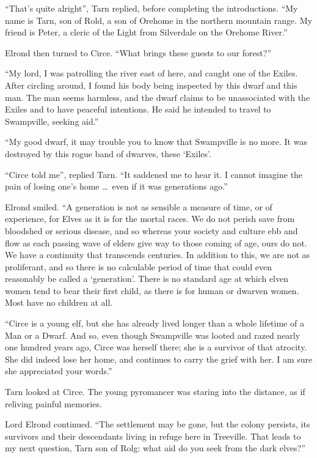 ``That's quite alright'', Tarn replied, before completing the introductions.  ``My name is Tarn, son of Rold, a son of Orehome in the northern mountain range.  My friend is Peter, a cleric of the Light from Silverdale on the Orehome River.''

Elrond then turned to Circe. ``What brings these guests to our forest?''

``My lord, I was patrolling the river east of here, and caught one of the Exiles.  After circling around, I found his body being inspected by this dwarf and this man.  The man seems harmless, and the dwarf claims to be unassociated with the Exiles and to have peaceful intentions.  He said he intended to travel to Swampville, seeking aid.''

``My good dwarf, it may trouble you to know that Swampville is no more.  It was destroyed by this rogue band of dwarves, these `Exiles'.

``Circe told me'', replied Tarn.  ``It saddened me to hear it.  I cannot imagine the pain of losing one's home \ldots\ even if it was generations ago.''

Elrond smiled.  ``A generation is not as sensible a measure of time, or of experience, for Elves as it is for the mortal races.  We do not perish save from bloodshed or serious disease, and so whereas your society and culture ebb and flow as each passing wave of elders give way to those coming of age, ours do not.  We have a continuity that transcends centuries.  In addition to this, we are not as proliferant, and so there is no calculable period of time that could even reasonably be called a `generation'.  There is no standard age at which elven women tend to bear their first child, as there is for human or dwarven women.  Most have no children at all.

``Circe is a young elf, but she has already lived longer than a whole lifetime of a Man or a Dwarf.  And so, even though Swampville was looted and razed nearly one hundred years ago, Circe was herself there; she is a survivor of that atrocity.  She did indeed lose her home, and continues to carry the grief with her.  I am sure she appreciated your words.''

Tarn looked at Circe.  The young pyromancer was staring into the distance, as if reliving painful memories.

Lord Elrond continued.  ``The settlement may be gone, but the colony persists, its survivors and their descendants living in refuge here in Treeville.  That leads to my next question, Tarn son of Rolg: what aid do you seek from the dark elves?''

